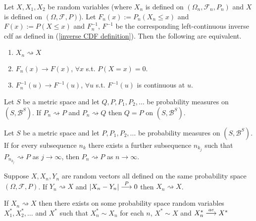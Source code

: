\begin{theorem}[{\bf Portmanteau II}]
Let $X, X_1, X_2$ be random variables (where $X_n$ is defined on $(\Omega_n, \mathcal F_n, P_n)$ and $X$ is defined on $(\Omega, \mathcal F, P)$). Let $F_n(x):= P_n(X_n\leq x)$ and $F(x):= P(X\leq x)$  and $F_n^{-1}$, $F^{-1}$ be the corresponding left-continuous inverse cdf as defined in (\ref{inverse CDF definition}). Then the following are equivalent.
\begin{enumerate}
\item $X_n\rightsquigarrow X$
\item $F_n(x)\rightarrow F(x)$, $\forall x$ s.t.\! $P(X=x)=0$.
\item $F^{-1}_n(u)\rightarrow F^{-1}(u)$, $\forall u$ s.t.\! $F^{-1}(u)$ is continuous at $u$.
\end{enumerate}
\end{theorem}



\begin{theorem}
Let $S$ be a metric space and let $Q, P, P_1, P_2, \ldots$ be probability measures on $(S, \mathcal B^S)$.
If $P_n\rightsquigarrow P$ and $P_n \rightsquigarrow Q$ then $Q=P$ on $(S, \mathcal B^S)$.
\end{theorem}



\begin{theorem}
Let $S$ be a metric space and let $ P, P_1, P_2, \ldots$ be probability measures on $(S, \mathcal B^S)$. If for every subsequence $n_k$ there exists a further subsequence $n_{k_j}$ such that $P_{n_{k_j}} \rightsquigarrow P$ as $j\rightarrow \infty$, then $P_n \rightsquigarrow P$ as $n\rightarrow \infty$.
\end{theorem}


\begin{theorem} Suppose $X, X_n, Y_n$ are random vectors all defined on the same probability space $(\Omega, \mathcal F, P)$. If $Y_n \rightsquigarrow X$ and $|X_n- Y_n|\overset{\small P} \longrightarrow 0$ then $X_n \rightsquigarrow X$.
\end{theorem}




\begin{theorem}
\label{Skorkhod 1}
If $X_n \rightsquigarrow X$ then there exists on some probability space random variables $X_1^*, X_2^*, \ldots$ and $X^*$ such that $X^*_n\sim X_n$ for each $n$, $X^*\sim X$ and $X_n^*\overset{\small ae} \longrightarrow X^*$
\end{theorem}

